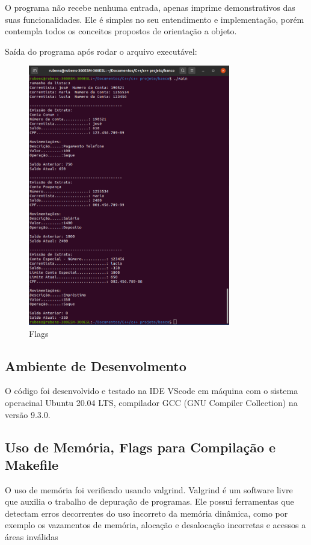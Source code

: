 \documentclass[conference]{IEEEtran}
\begin{document}
    O programa não recebe nenhuma entrada, apenas imprime demonstrativos das suas funcionalidades. Ele é simples no seu entendimento e implementação, porém contempla todos os conceitos propostos de orientação a objeto.

    Saída do programa após rodar o arquivo executável:
    \begin{figure}[htbp]
        \centering
        \includegraphics[width=8.8cm]{../img/exec.png}
        \caption{Flags}
        \label{fig_Flags}
    \end{figure}

    \subsection{Ambiente de Desenvolmento}

    O código foi desenvolvido e testado na IDE VScode em máquina com o sistema operacinal 
    Ubuntu 20.04 LTS, compilador GCC (GNU Compiler Collection) na versão 9.3.0.

    \subsection{Uso de Memória, Flags para Compilação e Makefile}
        O uso de memória foi verificado usando valgrind. Valgrind é um software livre que auxilia o trabalho de depuração de programas. Ele possui ferramentas que detectam erros decorrentes do uso incorreto da memória dinâmica, como por exemplo os vazamentos de memória, alocação e desalocação incorretas e acessos a áreas inválidas
        
\end{document}
